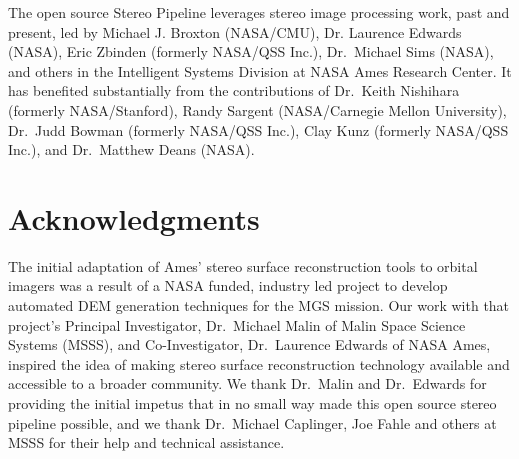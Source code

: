 The open source Stereo Pipeline leverages stereo image processing
work, past and present, led by Michael J. Broxton (NASA/CMU),
Dr. Laurence Edwards (NASA), Eric Zbinden (formerly NASA/QSS Inc.),
Dr.~Michael Sims (NASA), and others in the Intelligent Systems
Division at NASA Ames Research Center. It has benefited substantially
from the contributions of Dr.~Keith Nishihara (formerly
NASA/Stanford), Randy Sargent (NASA/Carnegie Mellon University),
Dr.~Judd Bowman (formerly NASA/QSS Inc.), Clay Kunz (formerly NASA/QSS
Inc.), and Dr.~Matthew Deans (NASA).

\section*{Acknowledgments}

The initial adaptation of Ames' stereo surface reconstruction tools to
orbital imagers was a result of a NASA funded, industry led project to
develop automated \ac{DEM} generation techniques for
the \ac{MGS} mission. Our work with that project's
Principal Investigator, Dr.~Michael Malin of Malin Space Science
Systems (MSSS), and Co-Investigator, Dr.~Laurence Edwards of NASA
Ames, inspired the idea of making stereo surface reconstruction
technology available and accessible to a broader community.  We thank
Dr.~Malin and Dr.~Edwards for providing the initial impetus that in no
small way made this open source stereo pipeline possible, and we thank
Dr.~Michael Caplinger, Joe Fahle and others at MSSS for their help and
technical assistance.

